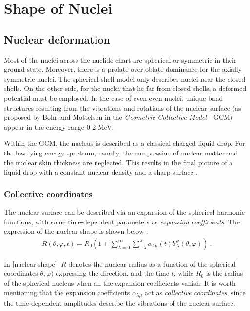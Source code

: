 \chapter{Shape of Nuclei}
\label{chapter-2}
\section{Nuclear deformation}

Most of the nuclei across the nuclide chart are spherical or symmetric in their ground state. Moreover, there is a prolate over oblate dominance for the axially symmetric nuclei. The spherical shell-model only describes nuclei near the closed shells. On the other side, for the nuclei that lie far from closed shells, a deformed potential must be employed. In the case of even-even nuclei, unique band structures resulting from the vibrations and rotations of the nuclear surface (as proposed by Bohr and Mottelson \cite{bohr1998nuclear} in the \emph{Geometric Collective Model} - GCM) appear in the energy range 0-2 MeV.

Within the GCM, the nucleus is described as a classical charged liquid drop. For the low-lying energy spectrum, usually, the compression of nuclear matter and the nuclear skin thickness are neglected. This results in the final picture of a liquid drop with a constant nuclear density and a sharp surface \cite{greiner1996nuclear}.

\subsection{Collective coordinates}

The nuclear surface can be described via an expansion of the spherical harmonic functions, with some time-dependent parameters as \emph{expansion coefficients}. The expression of the nuclear shape is shown below \cite{greiner1996nuclear}:
\begin{align}
    R(\theta,\varphi,t)=R_0\left(1+\sum_{\lambda=0}^\infty\sum_{-\lambda}^\lambda\alpha_{\lambda\mu}(t)Y_\lambda^\nu(\theta,\varphi)\right)\ .
    \label{nuclear-shape}
\end{align}

In \ref{nuclear-shape}, $R$ denotes the nuclear radius as a function of the spherical coordinates $\theta,\varphi)$ expressing the direction, and the time $t$, while $R_0$ is the radius of the spherical nucleus when all the expansion coefficients vanish. It is worth mentioning that the expansion coefficients $\alpha_{\lambda\mu}$ act as \emph{collective coordinates}, since the time-dependent amplitudes describe the vibrations of the nuclear surface.

